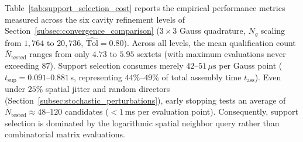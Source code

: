 \documentclass[preprint,12pt]{elsarticle}
\begin{document}
Table~\ref{tab:support_selection_cost} reports the empirical performance metrics measured across the six cavity refinement levels of Section~\ref{subsec:convergence_comparison} ($3 \times 3$ Gauss quadrature, $N_g$ scaling from $1{,}764$ to $20{,}736$, $\widehat{\mathrm{Tol}} = 0.80$). Across all levels, the mean qualification count $\bar{N}_{\mathrm{tested}}$ ranges from only $4.73$ to $5.95$ sextets (with maximum evaluations never exceeding $87$). Support selection consumes merely $42\text{--}51\,\mu\text{s}$ per Gauss point ($t_{\mathrm{sup}} = 0.091\text{--}0.881$\,s, representing $44\%\text{--}49\%$ of total assembly time $t_{\mathrm{ass}}$). Even under $25\%$ spatial jitter and random directors (Section~\ref{subsec:stochastic_perturbations}), early stopping tests an average of $\bar{N}_{\mathrm{tested}} \approx 48\text{--}120$ candidates ($< 1$\,ms per evaluation point). Consequently, support selection is dominated by the logarithmic spatial neighbor query rather than combinatorial matrix evaluations.
\end{document}
